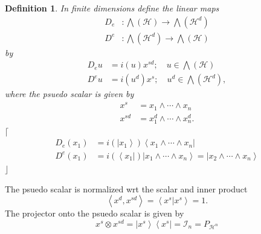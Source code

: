 \documentclass[aps,preprint]{revtex4}%
\newtheorem{definition}[theorem]{Definition}
\begin{document}
\begin{definition}
In finite dimensions define the linear maps%
\begin{align}
D_{e} &  :%
{\textstyle\bigwedge}
\left(  \mathcal{H}\right)  \rightarrow%
{\textstyle\bigwedge}
\left(  \mathcal{H}^{d}\right)  \\
D^{e} &  :%
{\textstyle\bigwedge}
\left(  \mathcal{H}^{d}\right)  \rightarrow%
{\textstyle\bigwedge}
\left(  \mathcal{H}\right)
\end{align}
by%
\begin{align}
D_{e}u &  =i\left(  u\right)  x^{sd};\quad u\in%
{\textstyle\bigwedge}
\left(  \mathcal{H}\right)  \\
D^{e}u &  =i\left(  u^{d}\right)  x^{s};\quad u^{d}\in%
{\textstyle\bigwedge}
\left(  \mathcal{H}^{d}\right)  ,
\end{align}
where the psuedo scalar is given by
\begin{align}
x^{s} &  =x_{1}\wedge\cdots\wedge x_{n}\\
x^{sd} &  =x_{1}^{d}\wedge\cdots\wedge x_{n}^{d}.
\end{align}
$\lceil$%
\begin{align}
D_{e}\left(  x_{1}\right)   &  =i\left(  \left\vert x_{1}\right\rangle
\right)  \left\langle x_{1}\wedge\cdots\wedge x_{n}\right\vert \\
D^{e}\left(  x_{1}\right)   &  =i\left(  \left\langle x_{1}\right\vert
\right)  \left\vert x_{1}\wedge\cdots\wedge x_{n}\right\rangle =\left\vert
x_{2}\wedge\cdots\wedge x_{n}\right\rangle
\end{align}
$\rfloor$
\end{definition}

The psuedo scalar is normalized wrt the scalar and inner product
\begin{equation}
\left\langle x^{d},x^{sd}\right\rangle =\left\langle \left.  x^{s}\right\vert
x^{s}\right\rangle =1.
\end{equation}
The projector onto the psuedo scalar is given by
\begin{equation}
x^{s}\otimes x^{sd}=\left\vert x^{s}\right\rangle \left\langle x^{s}%
\right\vert =\mathcal{I}_{n}=P_{\mathcal{H}^{n}}%
\end{equation}
\end{document}
